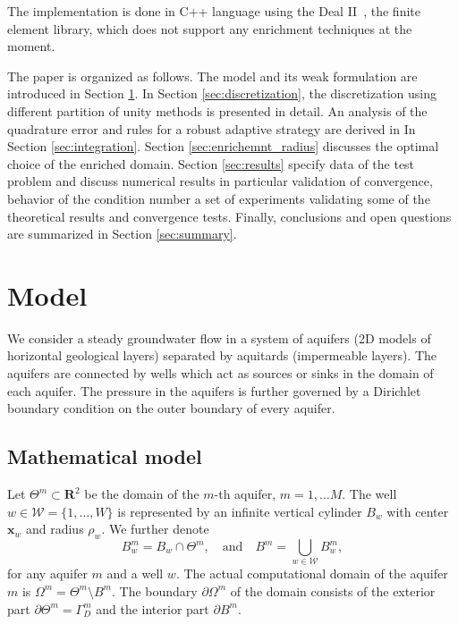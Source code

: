 \documentclass{elsarticle}
\def\vc#1{\mathbf{\boldsymbol{#1}}}     %
\newcommand{\R}{\mathbf{R}}
\begin{document}
The implementation is done in C++ language using the Deal II~\cite{bangerth_deal.ii_2007}, the finite element library,
which does not support any enrichment techniques at the moment.

The paper is organized as follows. The model and its weak formulation are introduced in Section \ref{sec:model}.
In Section \ref{sec:discretization}, the discretization using different partition of unity methods is presented in detail.
An analysis of the quadrature error and rules for a robust adaptive strategy are derived in In Section \ref{sec:integration}.
Section \ref{sec:enrichemnt_radius} discusses the optimal choice of the enriched domain.
Section \ref{sec:results} specify data of the test problem and discuss numerical results
in particular validation of convergence, behavior of the condition number a set of experiments validating some of the theoretical results and convergence tests.
Finally, conclusions and open questions are summarized in Section \ref{sec:summary}.

\section{Model}
\label{sec:model}
We consider a steady groundwater flow in a system of aquifers (2D models of horizontal geological layers)
separated by aquitards (impermeable layers). The aquifers are connected by wells which act as sources
or sinks in the domain of each aquifer. The pressure in the aquifers is further governed by a Dirichlet boundary 
condition on the outer boundary of every aquifer.

\subsection{Mathematical model}
Let $\Theta^m\subset \R^2$ be the domain of the $m$-th aquifer, $m=1,\ldots M$.
The well $w\in\mathcal{W}=\{1,\ldots,W\}$ is represented by an infinite vertical cylinder $B_w$
with center $\vc{x}_w$ and radius $\rho_w$.  We further denote 
\[
 B^m_w = B_w \cap \Theta^m, \quad \text{and} \quad
 B^m=\bigcup\limits_{w\in \mathcal{W}}B^m_w,
\]
for any aquifer $m$ and a well $w$.
The actual computational domain of the aquifer $m$ is $\Omega^m = \Theta^m\setminus B^m$. The boundary $\partial\Omega^m$ of 
the domain consists of the exterior part $\partial\Theta^m=\Gamma^m_D$ and the interior part $\partial B^m$.
\end{document}
